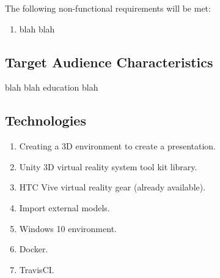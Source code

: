 	The following non-functional requirements will be met:

	\begin{enumerate}
			\item blah blah
	\end{enumerate}

\subsection{Target Audience Characteristics}

	blah blah education blah

\subsection{Technologies}
	\begin{enumerate}
		\item Creating a 3D environment to create a presentation.
		\item Unity 3D virtual reality system tool kit library.
		\item HTC Vive virtual reality gear (already available).
		\item Import external models.
		\item Windows 10 environment.
		\item Docker.
		\item TravisCI.
	\end{enumerate}

